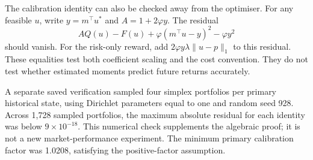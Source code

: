 \documentclass[sigconf,anonymous,review]{acmart}
\begin{document}
The calibration identity can also be checked away from the optimiser. For any feasible $u$, write $y=m^\top u^*$ and $A=1+2\varphi y$. The residual
\begin{equation}
 A Q(u)-F(u)+\varphi(m^\top u-y)^2-\varphi y^2
\end{equation}
should vanish. For the risk-only reward, add $2\varphi y\lambda\|u-p\|_1$ to this residual. These equalities test both coefficient scaling and the cost convention. They do not test whether estimated moments predict future returns accurately.

A separate saved verification sampled four simplex portfolios per primary historical state, using Dirichlet parameters equal to one and random seed 928. Across 1,728 sampled portfolios, the maximum absolute residual for each identity was below $9\times10^{-18}$. This numerical check supplements the algebraic proof; it is not a new market-performance experiment. The minimum primary calibration factor was 1.0208, satisfying the positive-factor assumption.
\end{document}
